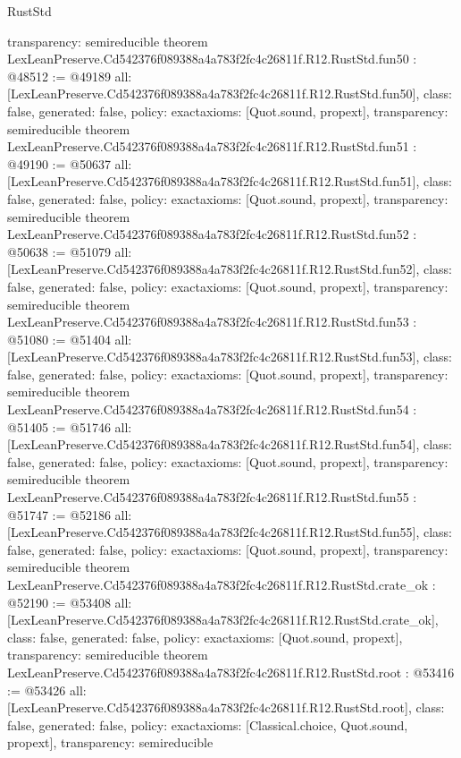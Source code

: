 \begin{lexlean}{RustStd}
\begin{coremodule}
{  transparency: semireducible
}
theorem LexLeanPreserve.Cd542376f089388a4a783f2fc4c26811f.R12.RustStd.fun50 : @48512 := @49189 {
  all: [LexLeanPreserve.Cd542376f089388a4a783f2fc4c26811f.R12.RustStd.fun50],
  class: false,
  generated: false,
  policy: exact{axioms: [Quot.sound, propext]},
  transparency: semireducible
}
theorem LexLeanPreserve.Cd542376f089388a4a783f2fc4c26811f.R12.RustStd.fun51 : @49190 := @50637 {
  all: [LexLeanPreserve.Cd542376f089388a4a783f2fc4c26811f.R12.RustStd.fun51],
  class: false,
  generated: false,
  policy: exact{axioms: [Quot.sound, propext]},
  transparency: semireducible
}
theorem LexLeanPreserve.Cd542376f089388a4a783f2fc4c26811f.R12.RustStd.fun52 : @50638 := @51079 {
  all: [LexLeanPreserve.Cd542376f089388a4a783f2fc4c26811f.R12.RustStd.fun52],
  class: false,
  generated: false,
  policy: exact{axioms: [Quot.sound, propext]},
  transparency: semireducible
}
theorem LexLeanPreserve.Cd542376f089388a4a783f2fc4c26811f.R12.RustStd.fun53 : @51080 := @51404 {
  all: [LexLeanPreserve.Cd542376f089388a4a783f2fc4c26811f.R12.RustStd.fun53],
  class: false,
  generated: false,
  policy: exact{axioms: [Quot.sound, propext]},
  transparency: semireducible
}
theorem LexLeanPreserve.Cd542376f089388a4a783f2fc4c26811f.R12.RustStd.fun54 : @51405 := @51746 {
  all: [LexLeanPreserve.Cd542376f089388a4a783f2fc4c26811f.R12.RustStd.fun54],
  class: false,
  generated: false,
  policy: exact{axioms: [Quot.sound, propext]},
  transparency: semireducible
}
theorem LexLeanPreserve.Cd542376f089388a4a783f2fc4c26811f.R12.RustStd.fun55 : @51747 := @52186 {
  all: [LexLeanPreserve.Cd542376f089388a4a783f2fc4c26811f.R12.RustStd.fun55],
  class: false,
  generated: false,
  policy: exact{axioms: [Quot.sound, propext]},
  transparency: semireducible
}
theorem LexLeanPreserve.Cd542376f089388a4a783f2fc4c26811f.R12.RustStd.crate_ok : @52190 := @53408 {
  all: [LexLeanPreserve.Cd542376f089388a4a783f2fc4c26811f.R12.RustStd.crate_ok],
  class: false,
  generated: false,
  policy: exact{axioms: [Quot.sound, propext]},
  transparency: semireducible
}
theorem LexLeanPreserve.Cd542376f089388a4a783f2fc4c26811f.R12.RustStd.root : @53416 := @53426 {
  all: [LexLeanPreserve.Cd542376f089388a4a783f2fc4c26811f.R12.RustStd.root],
  class: false,
  generated: false,
  policy: exact{axioms: [Classical.choice, Quot.sound, propext]},
  transparency: semireducible
}


\end{coremodule}
\end{lexlean}
